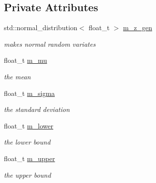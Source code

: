 \subsection*{Private Attributes}
\begin{DoxyCompactItemize}
\item 
\mbox{\label{classrvsamp_1_1TruncUnivNormSampler_a272eeaa23053de1bad153f34a7c34329}} 
std\+::normal\+\_\+distribution$<$ float\+\_\+t $>$ \hyperlink{classrvsamp_1_1TruncUnivNormSampler_a272eeaa23053de1bad153f34a7c34329}{m\+\_\+z\+\_\+gen}
\begin{DoxyCompactList}\small\item\em makes normal random variates \end{DoxyCompactList}\item 
\mbox{\label{classrvsamp_1_1TruncUnivNormSampler_a7c1024d6d70fec2999d611512f4c30b4}} 
float\+\_\+t \hyperlink{classrvsamp_1_1TruncUnivNormSampler_a7c1024d6d70fec2999d611512f4c30b4}{m\+\_\+mu}
\begin{DoxyCompactList}\small\item\em the mean \end{DoxyCompactList}\item 
\mbox{\label{classrvsamp_1_1TruncUnivNormSampler_af54c9b539c82e865952e938cee75df1b}} 
float\+\_\+t \hyperlink{classrvsamp_1_1TruncUnivNormSampler_af54c9b539c82e865952e938cee75df1b}{m\+\_\+sigma}
\begin{DoxyCompactList}\small\item\em the standard deviation \end{DoxyCompactList}\item 
\mbox{\label{classrvsamp_1_1TruncUnivNormSampler_a6405f385e9fb923d5aeae60324b745c1}} 
float\+\_\+t \hyperlink{classrvsamp_1_1TruncUnivNormSampler_a6405f385e9fb923d5aeae60324b745c1}{m\+\_\+lower}
\begin{DoxyCompactList}\small\item\em the lower bound \end{DoxyCompactList}\item 
\mbox{\label{classrvsamp_1_1TruncUnivNormSampler_a5081f5dfd44015a5af38572a4a22bf58}} 
float\+\_\+t \hyperlink{classrvsamp_1_1TruncUnivNormSampler_a5081f5dfd44015a5af38572a4a22bf58}{m\+\_\+upper}
\begin{DoxyCompactList}\small\item\em the upper bound \end{DoxyCompactList}\end{DoxyCompactItemize}
